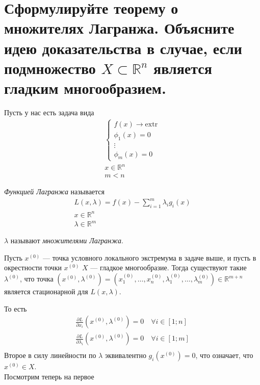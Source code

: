 \documentclass{article}
\begin{document}
\section{Сформулируйте теорему о множителях Лагранжа. Объясните идею доказательства в случае, если подмножество $X \subset \mathbb{R}^n$ является гладким многообразием.}
Пусть у нас есть задача вида
\begin{gather*}
    \begin{cases}
        f(x) \xrightarrow{} \mathrm{extr}\\
        \phi_1(x)=0\\
        \vdots\\
        \phi_m(x)=0
    \end{cases}\\
    x \in \mathbb{R}^n\\
    m < n
\end{gather*}
\begin{definition}
\textit{Функцией Лагранжа} называется
\begin{gather*}
    L(x,\lambda) = f(x) - \sum_{i=1}^m \lambda_i g_i(x)\\
    x \in \mathbb{R}^n\\
    \lambda \in \mathbb{R}^m
\end{gather*}
\end{definition}
$\lambda$ называют \textit{множителями Лагранжа}.\\
\begin{theorem}
\begin{sloppypar}
	Пусть $x^{(0)}$ --- точка условного локального экстремума в задаче выше, и пусть в окрестности точки $x^{(0)}$ $X$ --- гладкое многообразие. Тогда существуют такие $\lambda^{(0)}$, что точка ${(x^{(0)},\lambda^{(0)}) = (x^{(0)}_1,\dotsc, x^{(0)}_n, \lambda^{(0)}_1, \dotsc, \lambda^{(0)}_m) \in \mathbb{R}^{m+n}}$ является стационарной для $L(x, \lambda)$.
\end{sloppypar}
\end{theorem}
То есть
\begin{gather*}
\frac{\partial L}{\partial x_i}(x^{(0)},\lambda^{(0)}) = 0 \quad\forall i \in [1;n]\\
\frac{\partial L}{\partial \lambda_i}(x^{(0)},\lambda^{(0)}) = 0 \quad\forall i \in [1;m]\\
\end{gather*}
Второе в силу линейности по $\lambda$ эквивалентно $g_i(x^{(0)})=0$, что означает, что $x^{(0)} \in X$.\\
Посмотрим теперь на первое
\end{document}
